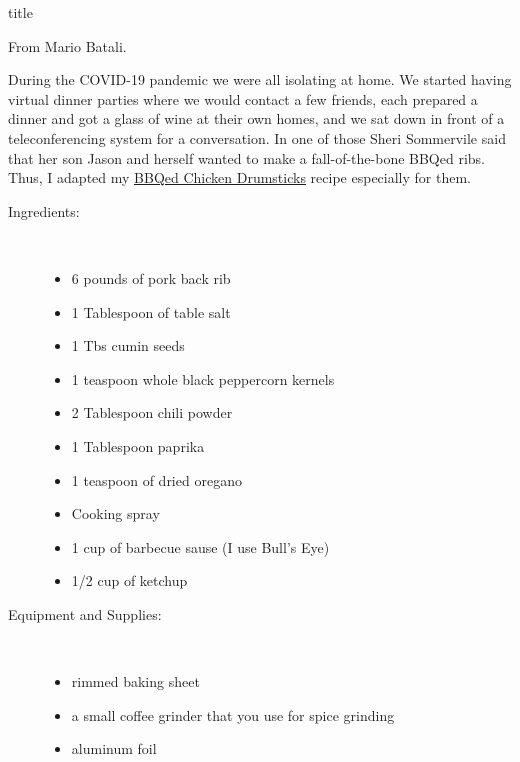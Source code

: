 \documentclass [11pt, letterpaper] {article}
\begin{document}
 {title}

\begin{flushright}
{From Mario Batali.}
\end{flushright}


During the COVID-19 pandemic we were all isolating at home. We started having virtual dinner parties where we would contact a few friends, each prepared a dinner and got a glass of wine at their own homes, and we sat down in front of a teleconferencing system for a conversation. In one of those Sheri Sommervile said that her son Jason and herself wanted to make a fall-of-the-bone BBQed ribs. Thus, I adapted my \href{BBQedChickenDrumSticks.html}{BBQed Chicken Drumsticks} recipe especially for them.

\begin{description}

\item[Ingredients:]\ \\
	\begin{itemize}
	\item 6 pounds of  pork back rib
	\item 1 Tablespoon of table salt
	\item 1 Tbs cumin seeds
	\item 1 teaspoon whole black peppercorn kernels
	\item 2 Tablespoon chili powder
	\item 1 Tablespoon paprika
        \item 1 teaspoon of dried oregano
	\item Cooking spray
	\item 1 cup of barbecue sause (I use Bull's Eye)
	\item 1/2 cup of ketchup
	\end{itemize}
\item[Equipment and Supplies:]\ \\
	\begin{itemize}
	\item rimmed baking sheet
	\item a small coffee grinder that you use for spice grinding
	\item aluminum foil
	\end{itemize}


\end{description}
\end{document}
